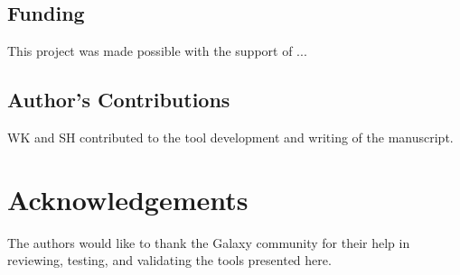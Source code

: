 \documentclass[a4paper,num-refs]{oup-contemporary}
\begin{document}
\subsection{Funding}
This project was made possible with the support of ...


\subsection{Author's Contributions}
WK and SH contributed to the tool development and writing of the manuscript.


\section{Acknowledgements}
The authors would like to thank the Galaxy community for their help in reviewing, testing, and validating the tools presented here.


\end{document}
